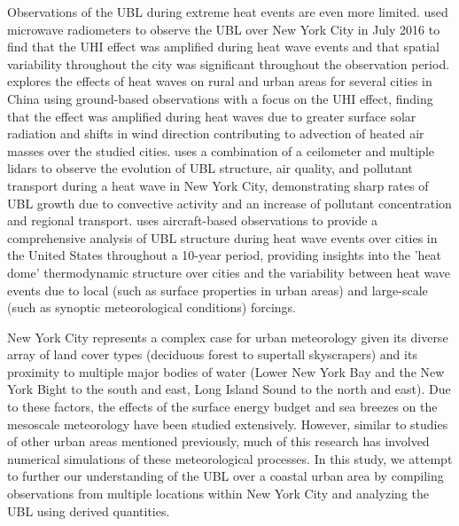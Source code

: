 \documentclass[num-refs]{wiley-article}
\begin{document}
Observations of the UBL during extreme heat events are even more limited. \citet{ramamurthy2017} used microwave radiometers to observe the UBL over New York City in July 2016 to find that the UHI effect was amplified during heat wave events and that spatial variability throughout the city was significant throughout the observation period. \citet{jiang2019} explores the effects of heat waves on rural and urban areas for several cities in China using ground-based observations with a focus on the UHI effect, finding that the effect was amplified during heat waves due to greater surface solar radiation and shifts in wind direction contributing to advection of heated air masses over the studied cities. \citep{wu2019} uses a combination of a ceilometer and multiple lidars to observe the evolution of UBL structure, air quality, and pollutant transport during a heat wave in New York City, demonstrating sharp rates of UBL growth due to convective activity and an increase of pollutant concentration and regional transport. \citet{zhang2020} uses aircraft-based observations to provide a comprehensive analysis of UBL structure during heat wave events over cities in the United States throughout a 10-year period, providing insights into the 'heat dome' thermodynamic structure over cities and the variability between heat wave events due to local (such as surface properties in urban areas) and large-scale (such as synoptic meteorological conditions) forcings. 


New York City represents a complex case for urban meteorology given its diverse array of land cover types (deciduous forest to supertall skyscrapers) and its proximity to multiple major bodies of water (Lower New York Bay and the New York Bight to the south and east, Long Island Sound to the north and east). Due to these factors, the effects of the surface energy budget \citep{hrisko2021, ramamurthy2014, tewari2019} and sea breezes \citep{childs2005, colle2010, frizzola1963, gedzelman2003, melecio2018, thompson2007} on the mesoscale meteorology have been studied extensively. However, similar to studies of other urban areas mentioned previously, much of this research has involved numerical simulations of these meteorological processes. In this study, we attempt to further our understanding of the UBL over a coastal urban area by compiling observations from multiple locations within New York City and analyzing the UBL using derived quantities.
\end{document}
